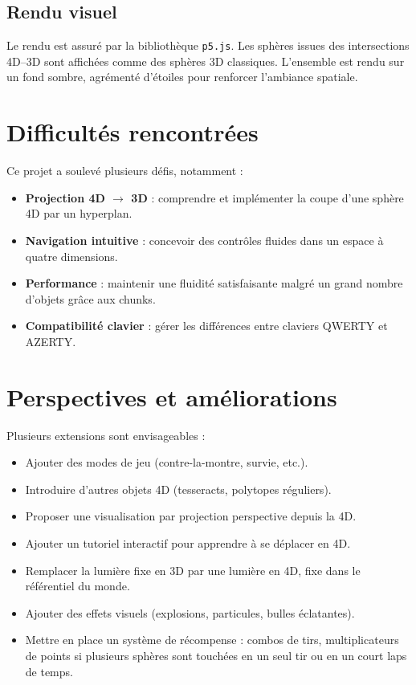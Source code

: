 \documentclass[11pt,a4paper]{article}
\begin{document}
\subsection{Rendu visuel}

Le rendu est assuré par la bibliothèque \texttt{p5.js}. Les sphères issues des intersections 4D–3D sont affichées comme des sphères 3D classiques. L’ensemble est rendu sur un fond sombre, agrémenté d’étoiles pour renforcer l’ambiance spatiale.

\section{Difficultés rencontrées}

Ce projet a soulevé plusieurs défis, notamment :
\begin{itemize}
    \item \textbf{Projection 4D $\rightarrow$ 3D} : comprendre et implémenter la coupe d’une sphère 4D par un hyperplan.
    \item \textbf{Navigation intuitive} : concevoir des contrôles fluides dans un espace à quatre dimensions.
    \item \textbf{Performance} : maintenir une fluidité satisfaisante malgré un grand nombre d’objets grâce aux chunks.
    \item \textbf{Compatibilité clavier} : gérer les différences entre claviers QWERTY et AZERTY.
\end{itemize}

\section{Perspectives et améliorations}

Plusieurs extensions sont envisageables :
\begin{itemize}
    \item Ajouter des modes de jeu (contre-la-montre, survie, etc.).
    \item Introduire d’autres objets 4D (tesseracts, polytopes réguliers).
    \item Proposer une visualisation par projection perspective depuis la 4D.
    \item Ajouter un tutoriel interactif pour apprendre à se déplacer en 4D.
    \item Remplacer la lumière fixe en 3D par une lumière en 4D, fixe dans le référentiel du monde.
    \item Ajouter des effets visuels (explosions, particules, bulles éclatantes).
    \item Mettre en place un système de récompense : combos de tirs, multiplicateurs de points si plusieurs sphères sont touchées en un seul tir ou en un court laps de temps.
\end{itemize}
\end{document}
